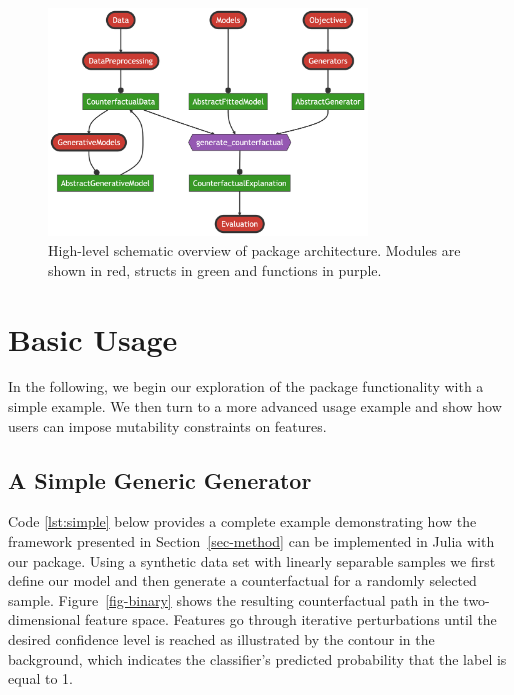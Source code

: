 \documentclass{juliacon}
\begin{document}
\begin{figure}

{\centering \includegraphics[width=3.33333in,height=2.38095in]{www/pkg_architecture.png}

}

\caption{\label{fig-arch}High-level schematic overview of package
architecture. Modules are shown in red, structs in green and functions
in purple.}

\end{figure}

\hypertarget{sec-use}{%
\section{Basic Usage}\label{sec-use}}

In the following, we begin our exploration of the package functionality
with a simple example. We then turn to a more advanced usage example and
show how users can impose mutability constraints on features.

\hypertarget{a-simple-generic-generator}{%
\subsection{A Simple Generic
Generator}\label{a-simple-generic-generator}}

Code \ref{lst:simple} below provides a complete example demonstrating
how the framework presented in Section~\ref{sec-method} can be
implemented in Julia with our package. Using a synthetic data set with
linearly separable samples we first define our model and then generate a
counterfactual for a randomly selected sample. Figure~\ref{fig-binary}
shows the resulting counterfactual path in the two-dimensional feature
space. Features go through iterative perturbations until the desired
confidence level is reached as illustrated by the contour in the
background, which indicates the classifier's predicted probability that
the label is equal to 1.
\end{document}
